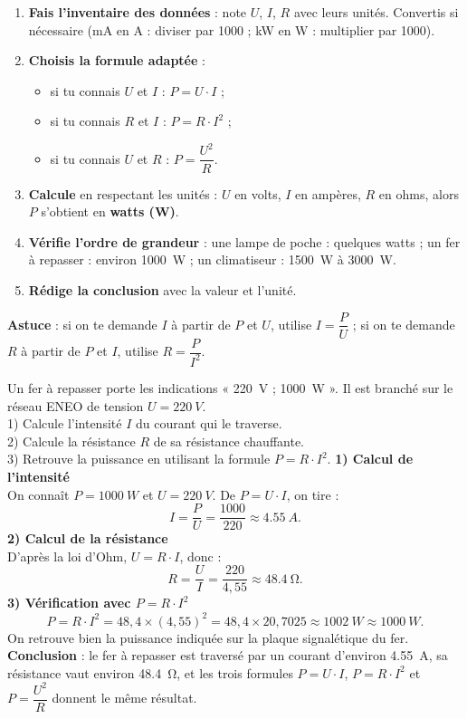 \documentclass[11pt]{article}
\begin{document}
\begin{methode}[Utiliser P = U.I = R.I²]
\begin{enumerate}
\item \textbf{Fais l'inventaire des données} : note $U$, $I$, $R$ avec leurs unités. Convertis si nécessaire (mA en A : diviser par 1000 ; kW en W : multiplier par 1000).
\item \textbf{Choisis la formule adaptée} :
\begin{itemize}
\item si tu connais $U$ et $I$ : $P = U \cdot I$ ;
\item si tu connais $R$ et $I$ : $P = R \cdot I^{2}$ ;
\item si tu connais $U$ et $R$ : $P = \dfrac{U^{2}}{R}$.
\end{itemize}
\item \textbf{Calcule} en respectant les unités : $U$ en volts, $I$ en ampères, $R$ en ohms, alors $P$ s'obtient en \textbf{watts (W)}.
\item \textbf{Vérifie l'ordre de grandeur} : une lampe de poche : quelques watts ; un fer à repasser : environ \SI{1000}{W} ; un climatiseur : \SI{1500}{W} à \SI{3000}{W}.
\item \textbf{Rédige la conclusion} avec la valeur et l'unité.
\end{enumerate}
\textbf{Astuce} : si on te demande $I$ à partir de $P$ et $U$, utilise $I = \dfrac{P}{U}$ ; si on te demande $R$ à partir de $P$ et $I$, utilise $R = \dfrac{P}{I^{2}}$.
\end{methode}

\begin{exoresolu}
Un fer à repasser porte les indications « \SI{220}{V} ; \SI{1000}{W} ». Il est branché sur le réseau ENEO de tension $U = \SI{220}{V}$.\\
1) Calcule l'intensité $I$ du courant qui le traverse.\\
2) Calcule la résistance $R$ de sa résistance chauffante.\\
3) Retrouve la puissance en utilisant la formule $P = R \cdot I^{2}$.
\tcblower
\textbf{1) Calcul de l'intensité}\\
On connaît $P = \SI{1000}{W}$ et $U = \SI{220}{V}$. De $P = U \cdot I$, on tire :
\[ I = \frac{P}{U} = \frac{1000}{220} \approx \SI{4,55}{A}. \]
\textbf{2) Calcul de la résistance}\\
D'après la loi d'Ohm, $U = R \cdot I$, donc :
\[ R = \frac{U}{I} = \frac{220}{4,55} \approx \SI{48,4}{\ohm}. \]
\textbf{3) Vérification avec $P = R \cdot I^{2}$}\\
\[ P = R \cdot I^{2} = 48,4 \times (4,55)^{2} = 48,4 \times 20,7025 \approx \SI{1002}{W} \approx \SI{1000}{W}. \]
On retrouve bien la puissance indiquée sur la plaque signalétique du fer.\\
\textbf{Conclusion} : le fer à repasser est traversé par un courant d'environ \SI{4,55}{A}, sa résistance vaut environ \SI{48,4}{\ohm}, et les trois formules $P = U \cdot I$, $P = R \cdot I^{2}$ et $P = \dfrac{U^{2}}{R}$ donnent le même résultat.
\end{exoresolu}
\end{document}
